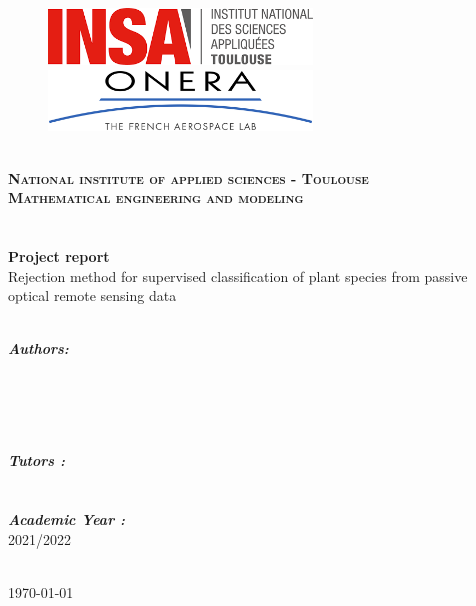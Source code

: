 \begin{titlepage}
\begin{center}
\begin{figure}[h]
    \begin{minipage}[c]{.46\linewidth}
        \centering
        \includegraphics[width=7cm]{insalogo.png} 
    \end{minipage}
    \hfill
    \begin{minipage}[c]{.46\linewidth}
        \centering
        \includegraphics[width=7cm]{ONERA_logo.png}
    \end{minipage}
\end{figure} \\[3cm]

\textbf{\textsc{\LARGE National institute of applied sciences - Toulouse}\\[2cm]}
\textsc{\Large \textbf{Mathematical engineering and modeling}}\\  
\\ [0.25cm]

\HRule \\[0.4cm]
{\huge \textbf{Project report\\[0.2cm] }}
{\LARGE Rejection method for supervised classification of plant species from passive optical remote sensing data\\
[0.4cm] }
\HRule \\[5cm]

\begin{minipage}{0.4\textwidth}
\begin{flushleft} \large
\emph{\textbf{Authors:}}\\[0.1cm]
\\
\\
\\
\\
\end{flushleft}
\end{minipage}
\begin{minipage}{0.4\textwidth}
\begin{flushright} \large
\emph{\textbf{Tutors :}} \\[0.1cm]
\\
\\[0.3cm]
\emph{\textbf{Academic Year :}} \\[0.1cm]
2021/2022\\[0.7cm]
\end{flushright}
\end{minipage}\\[1cm]

\today

\end{center}
\end{titlepage}

